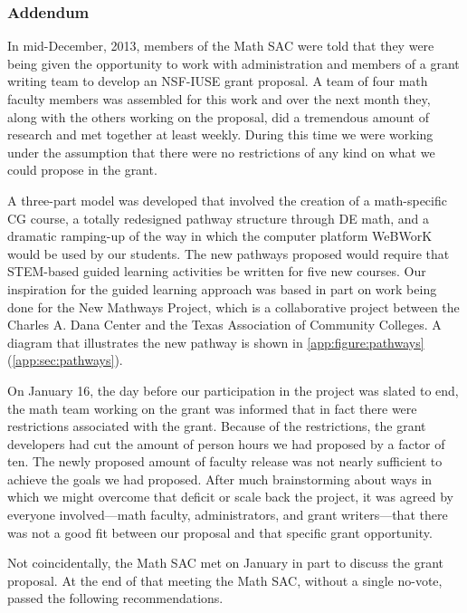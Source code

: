 \subsubsection{Addendum}\label{over:subsub:nsfiuse}
In mid-December, 2013, members of the Math SAC were told that they were being
given the opportunity to work with administration and members of a grant writing
team to develop an NSF-IUSE grant proposal.  A team of four math faculty members
was assembled for this work and over the next month they, along with the others
working on the proposal, did a tremendous amount of research and met together at
least weekly.  During this time we were working under the assumption that there
were no restrictions of any kind on what we could propose in the grant.

A three-part model was developed that involved the creation of a math-specific
CG course, a totally redesigned pathway structure through DE math, and a
dramatic ramping-up of the way in which the computer platform WeBWorK would be
used by our students.  The new pathways proposed would require that STEM-based
guided learning activities be written for five new courses.  Our inspiration for
the guided learning approach was based in part on work being done for the New
Mathways Project,  which is a collaborative project between the Charles A. Dana
Center and the Texas Association of Community Colleges. A diagram that
illustrates the new pathway is shown in \cref{app:figure:pathways}
(\vref{app:sec:pathways}).

On January 16, the day before our participation in the project was slated to
end, the math team working on the grant was informed that in fact there were
restrictions associated with the grant.  Because of the restrictions, the grant
developers had cut the amount of person hours we had proposed by a factor of
ten.  The newly proposed amount of faculty release was not nearly sufficient to
achieve the goals we had proposed.  After much brainstorming about ways in which we
might overcome that deficit or scale back the project, it
was agreed by everyone involved---math faculty, administrators, and grant
writers---that there was not a good fit between our proposal and that specific
grant opportunity.

Not coincidentally, the Math SAC met on January  in part to discuss the grant
proposal.  At the end of that meeting the Math SAC, without a single no-vote,
passed the following recommendations.


